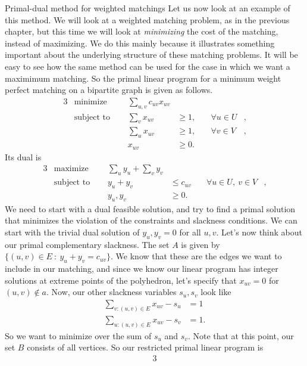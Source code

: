 \documentclass[11pt]{article}
\renewcommand{\'}{^{'}}
\begin{document}
\begin{section}{Primal-dual method for weighted matchings}
	Let us now look at an example of this method. We will look at a weighted matching problem, as 
	in the previous chapter, but this time we will look at \emph{minimizing} the cost of the 
	matching, instead of maximizing. We do this mainly because it illustrates something important 
	about the underlying structure of these matching problems. It will be easy to see how the 
	same method can be used for the case in which we want a maximimum matching. So the primal 
	linear program for a minimum weight perfect matching on a bipartite graph is given as follows. 
	\begin{alignat}{3}
		& \text{minimize } & \sum_{u,v} c_{uv} x_{uv}& \\
		& \text{subject to } \quad & \sum_{v} x_{uv} & \geq 1, & \quad \forall u\in U&, \\
				     &\quad & \sum_{u} x_{uv} & \geq 1, & \quad \forall v\in V &, \\
				&& x_{uv} & \geq 0.
	\end{alignat}
	Its dual is
	\begin{alignat}{3}
		& \text{maximize } & \sum_{u}y_u + \sum_{v}y_v & \\
		& \text{subject to } \quad & y_u + y_v & \leq c_{uv} & \quad \forall 
					u\in U,\ v\in V &, \\
				    && y_u,y_v & \geq 0.
	\end{alignat}
	We need to start with a dual feasible solution, and try to find a primal solution that 
	minimizes the violation of the constraints and slackness conditions. We can start with the 
	trivial dual solution of $y_u,y_v = 0$ for all $u,v$. Let's now think about our primal 
	complementary slackness. The set $A$ is given by $\{(u,v)\in E\ :\ y_u + y_v = c_{uv}\}$. 
	We know that these are the edges we want to include in our matching, and since we know our 
	linear program has integer solutions at extreme points of the polyhedron, let's specify that 
	$x_{uv} = 0$ for $(u,v)\notin a$. Now, our other slackness variables $s_u,s_v$ look like 
	\begin{align*}
		\sum_{v:(u,v)\in E} x_{uv} - s_u &= 1 \\
		\sum_{u:(u,v)\in E} x_{uv} - s_v &= 1.
	\end{align*}
	So we want to minimize over the sum of $s_u$ and $s_v$. Note that at this point, our set $B$ 
	consists of all vertices. So our restricted primal linear program is
	\begin{alignat}{3}

\end{alignat}
\end{section}
\end{document}
